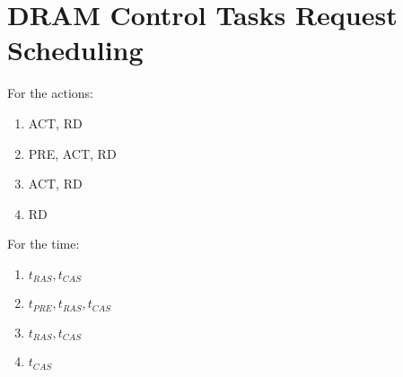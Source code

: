 \documentclass{article}
\begin{document}
    \section{DRAM Control Tasks Request Scheduling}
    For the actions:
    \begin{enumerate}
    \item ACT, RD
    \item PRE, ACT, RD
    \item ACT, RD
    \item RD
    \end{enumerate}
    For the time:
    \begin{enumerate}
    \item $t_{RAS}, t_{CAS}$
    \item $t_{PRE}, t_{RAS}, t_{CAS}$
    \item $t_{RAS}, t_{CAS}$
    \item $t_{CAS}$
    \end{enumerate}
\end{document}
